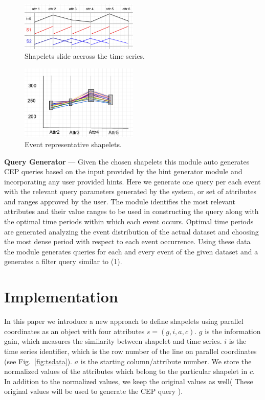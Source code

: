 \documentclass[conference]{IEEEtran}  %
\begin{document}
\begin{figure}
\includegraphics[width=0.5\textwidth]{movingWindow.png}
\caption{Shapelets slide accross the time series.}
\label{fig:tsshapes}
\end{figure}

\begin{figure}
\includegraphics[width=0.5\textwidth]{demo.png}
\caption{Event representative shapelets.}
\label{fig:tswin}
\end{figure}

\textbf{Query Generator} --- Given the chosen shapelets this module auto generates CEP queries based on the input provided by the hint generator module and incorporating any user provided hints. Here we generate one query per each event with the relevant query parameters generated by the system, or set of attributes and ranges approved by the user. The module identifies the most relevant attributes and their value ranges to be used in constructing the query along with the optimal time periods within which each event occurs. Optimal time periods are generated analyzing the event distribution of the actual dataset and choosing the most dense period with respect to each event occurrence. Using these data the module generates queries for each and every event of the given dataset and a generates a filter query similar to (1).

\section{Implementation}
In this paper we introduce a new approach to define shapelets using parallel coordinates as an object with four attributes ${s = (g,i,a,c)}$. $g$ is the information gain, which measures the similarity between shapelet and time series. $i$ is the time series identifier, which is the row number of the line on parallel coordinates (see Fig.~\ref{fig:tsdata}). $a$ is the starting column/attribute number. We store the normalized values of the attributes which belong to the particular shapelet in $c$. In addition to the normalized values, we keep the original values as well( These original values will be used to generate the CEP query ).
%
%
%
\end{document}
